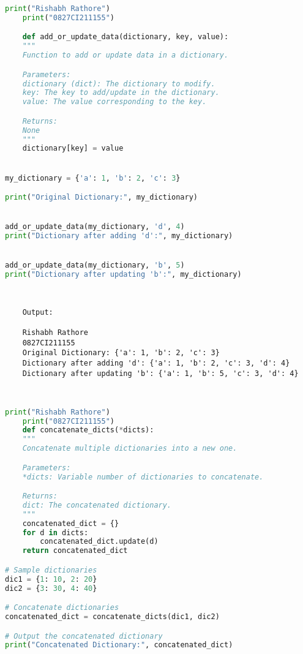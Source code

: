 \documentclass{report}
\begin{document}
\newpage


\sol 
\begin{lstlisting}[language=Python]
	print("Rishabh Rathore")
	print("0827CI211155")

	def add_or_update_data(dictionary, key, value):
    """
    Function to add or update data in a dictionary.

    Parameters:
    dictionary (dict): The dictionary to modify.
    key: The key to add/update in the dictionary.
    value: The value corresponding to the key.

    Returns:
    None
    """
    dictionary[key] = value


my_dictionary = {'a': 1, 'b': 2, 'c': 3}

print("Original Dictionary:", my_dictionary)


add_or_update_data(my_dictionary, 'd', 4)
print("Dictionary after adding 'd':", my_dictionary)


add_or_update_data(my_dictionary, 'b', 5)
print("Dictionary after updating 'b':", my_dictionary)

  

\end{lstlisting}

\begin{verbatim}
	Output:

	Rishabh Rathore
	0827CI211155
	Original Dictionary: {'a': 1, 'b': 2, 'c': 3}
	Dictionary after adding 'd': {'a': 1, 'b': 2, 'c': 3, 'd': 4}
	Dictionary after updating 'b': {'a': 1, 'b': 5, 'c': 3, 'd': 4}

	

\end{verbatim}

\newpage


\sol 
\begin{lstlisting}[language=Python]
	print("Rishabh Rathore")
	print("0827CI211155")
	def concatenate_dicts(*dicts):
    """
    Concatenate multiple dictionaries into a new one.

    Parameters:
    *dicts: Variable number of dictionaries to concatenate.

    Returns:
    dict: The concatenated dictionary.
    """
    concatenated_dict = {}
    for d in dicts:
        concatenated_dict.update(d)
    return concatenated_dict

# Sample dictionaries
dic1 = {1: 10, 2: 20}
dic2 = {3: 30, 4: 40}

# Concatenate dictionaries
concatenated_dict = concatenate_dicts(dic1, dic2)

# Output the concatenated dictionary
print("Concatenated Dictionary:", concatenated_dict)


\end{lstlisting}
\end{document}
